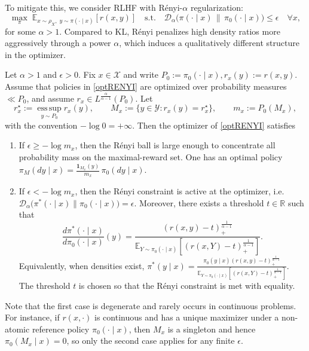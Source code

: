 \documentclass[11pt]{article}
\providecommand{\DD}{\mathcal{D}}
\begin{document}
To mitigate this, we consider RLHF with R\'enyi-$\alpha$ regularization:
\begin{equation}\label{optRENYI}
\max_{\pi}\;
\mathbb{E}_{x\sim\rho_X,\;y\sim\pi(\cdot\mid x)}[r(x,y)]
\quad\text{s.t.}\quad
\DD_{\alpha}\bigl(\pi(\cdot\mid x)\,\|\,\pi_0(\cdot\mid x)\bigr)\le\epsilon
\quad\forall x,
\end{equation}
for some $\alpha>1$.
Compared to KL, R\'enyi penalizes high density ratios more
aggressively through a power $\alpha$, which induces a qualitatively different
structure in the optimizer.

\begin{lemma}\label{renyisol}
Let $\alpha>1$ and $\epsilon>0$. Fix $x\in\mathcal X$ and write $P_0:=\pi_0(\cdot\mid x), r_x(y):=r(x,y)$. Assume that policies in \eqref{optRENYI} are optimized over probability measures $\ll P_0$, and assume
$r_x\in L^{\frac{\alpha}{\alpha-1}}(P_0)$.
Let
\[r_x^\star:=\operatorname*{ess\,sup}_{y\sim P_0} r_x(y),
\qquad
M_x:=\{y\in\mathcal Y:r_x(y)=r_x^\star\},
\qquad
m_x:=P_0(M_x),
\]
with the convention $-\log 0=+\infty$.
Then the optimizer of \eqref{optRENYI} satisfies
\begin{enumerate}
\item If $\epsilon\ge -\log m_x$, then the R\'enyi ball is large enough to concentrate all probability mass on
the maximal-reward set. One has an optimal policy
$
\pi_M(dy\mid x)
=
\frac{\mathbf 1_{M_x}(y)}{m_x}\,\pi_0(dy\mid x)$.

\item If $\epsilon<-\log m_x$, then the R\'enyi constraint is active at the optimizer, i.e.
$
\mathcal D_\alpha\bigl(\pi^*(\cdot\mid x)\|\pi_0(\cdot\mid x)\bigr)
=
\epsilon$. Moreover, there exists a threshold $t\in\mathbb R$ such that
\[
\frac{d\pi^*(\cdot\mid x)}{d\pi_0(\cdot\mid x)}(y)
=
\frac{(r(x,y)-t)_+^{\frac1{\alpha-1}}}
{\mathbb E_{Y\sim\pi_0(\cdot\mid x)}
[(r(x,Y)-t)_+^{\frac1{\alpha-1}}]}.
\]
Equivalently, when densities exist,
$\pi^*(y\mid x)
=
\frac{
\pi_0(y\mid x)(r(x,y)-t)_+^{\frac1{\alpha-1}}
}{
\mathbb E_{Y\sim\pi_0(\cdot\mid x)}
[(r(x,Y)-t)_+^{\frac1{\alpha-1}}]
}$. The threshold $t$ is chosen so that the R\'enyi constraint is met with equality.
\end{enumerate}
\end{lemma}

Note that the first case is degenerate and rarely occurs in continuous problems. For instance, if $r(x,\cdot)$ is continuous and has a unique maximizer under a non-atomic reference policy $\pi_0(\cdot\mid x)$, then $M_x$ is a singleton and hence $\pi_0(M_x\mid x)=0$, so only the second case applies for any finite $\epsilon$.
\end{document}
